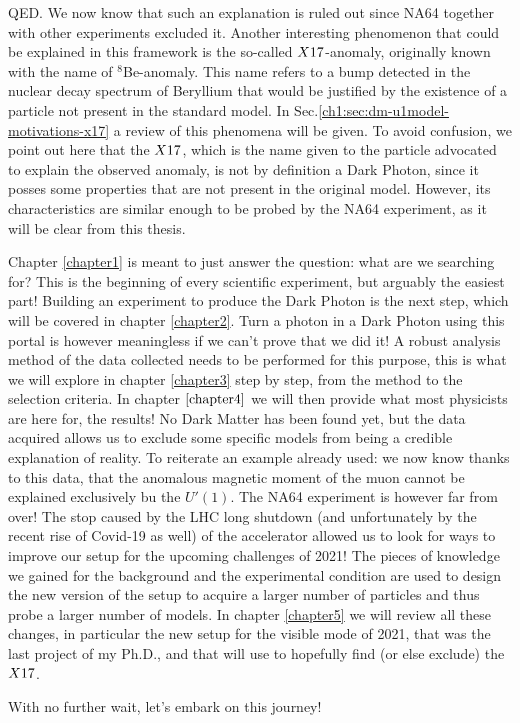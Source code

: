 QED. We now know that such an explanation is ruled out since NA64 together with other experiments excluded it. Another interesting phenomenon that could be explained in this framework is the so-called $X17$-anomaly, originally known with the name of $^8$Be-anomaly. This name refers to a bump detected in the nuclear decay spectrum of Beryllium that would be justified by the existence of a particle not present in the standard model. In Sec.\ref{ch1:sec:dm-u1model-motivations-x17} a review of this phenomena will be given. To avoid confusion, we point out here that the $X17$, which is the name given to the particle advocated to explain the observed anomaly, is not by definition a Dark Photon, since it posses some properties that are not present in the original model. However, its characteristics are similar enough to be probed by the NA64 experiment, as it will be clear from this thesis.

Chapter \ref{chapter1} is meant to just answer the question: what are we searching for? This is the beginning of every scientific experiment, but arguably the easiest part! Building an experiment to produce the Dark Photon is the next step, which will be covered in chapter \ref{chapter2}. Turn a photon in a Dark Photon using this portal is however meaningless if we can't prove that we did it! A robust analysis method of the data collected needs to be performed for this purpose, this is what we will explore in chapter \ref{chapter3} step by step, from the method to the selection criteria. In chapter $\ref{chapter4}$ we will then provide what most physicists are here for, the results! No Dark Matter has been found yet, but the data acquired allows us to exclude some specific models from being a credible explanation of reality. To reiterate an example already used: we now know thanks to this data, that the anomalous magnetic moment of the muon cannot be explained exclusively bu the $U'(1)$. The NA64 experiment is however far from over! The stop caused by the LHC long shutdown (and unfortunately by the recent rise of Covid-19 as well) of the accelerator allowed us to look for ways to improve our setup for the upcoming challenges of 2021! The pieces of knowledge we gained for the background and the experimental condition are used to design the new version of the setup to acquire a larger number of particles and thus probe a larger number of models. In chapter \ref{chapter5} we will review all these changes, in particular the new setup for the visible mode of 2021, that was the last project of my Ph.D., and that will use to hopefully find (or else exclude) the $X17$.

With no further wait, let's embark on this journey!


